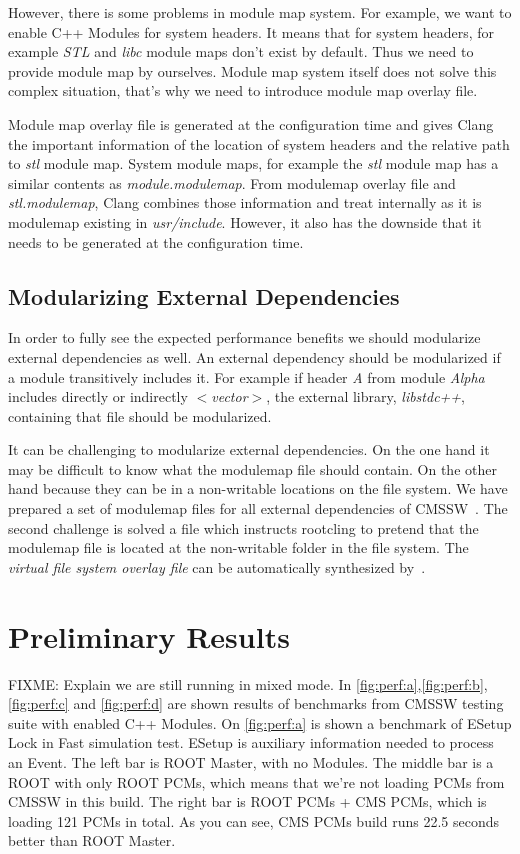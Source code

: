 \documentclass[12pt]{iopart}
\begin{document}
However, there is some problems in module map system.  For example, we want to enable C++ Modules for system headers. It means that for system headers, for example \textit{STL} and \textit{libc} module maps don’t exist by default. Thus we need to provide module map by ourselves. Module map system itself does not solve this complex situation, that’s why we need to introduce module map overlay file.

Module map overlay file is generated at the configuration time and gives Clang the important information of the location of system headers and the relative path to \textit{stl} module map. System module maps, for example the \textit{stl} module map has a similar contents as \textit{module.modulemap}. From modulemap overlay file and \textit{stl.modulemap}, Clang combines those information and treat internally as it is modulemap existing in \textit{usr/include}. However, it also has the downside that it needs to be generated at the configuration time.


\subsection{Modularizing External Dependencies}

In order to fully see the expected performance benefits we should modularize external dependencies as well. An external dependency should be modularized if a module transitively includes it. For example if header \textit{A} from module \textit{Alpha} includes directly or indirectly \textit{$<$vector$>$}, the external library, \textit{libstdc++}, containing that file should be modularized.

It can be challenging to modularize external dependencies. On the one hand it may be difficult to know what the modulemap file should contain. On the other hand because they can be in a non-writable locations on the file system. We have prepared a set of modulemap files for all external dependencies of CMSSW~\cite{raphael-auto-Modules}. The second challenge is solved a file which instructs rootcling to pretend that the modulemap file is located at the non-writable folder in the file system. The \textit{virtual file system overlay file} can be automatically synthesized by~\cite{raphael-auto-Modules}.


\section{Preliminary Results}
\label{results}
FIXME: Explain we are still running in mixed mode.
In \ref{fig:perf:a},\ref{fig:perf:b},\ref{fig:perf:c} and \ref{fig:perf:d} are shown results of benchmarks from CMSSW testing suite with enabled C++ Modules. On \ref{fig:perf:a} is shown a benchmark of ESetup Lock in Fast simulation test. ESetup is auxiliary information needed to process an Event. The left bar is ROOT Master, with no Modules. The middle bar is a ROOT with only ROOT PCMs, which means that we're not loading PCMs from CMSSW in this build. The right bar is ROOT PCMs + CMS PCMs, which is loading 121 PCMs in total. As you can see, CMS PCMs build runs 22.5 seconds better than ROOT Master.
\end{document}

